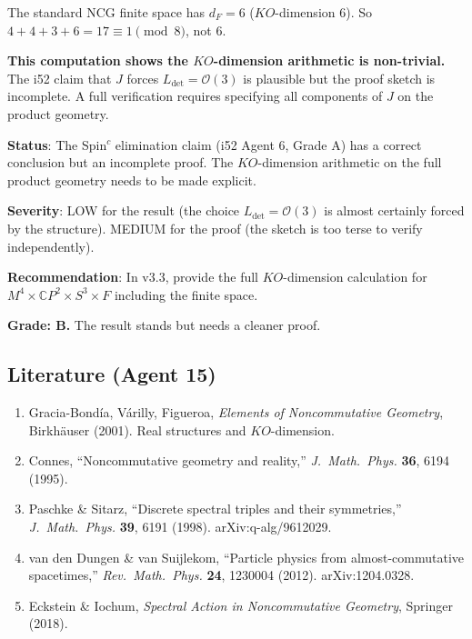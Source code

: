 \documentclass[11pt,a4paper]{article}
\newcommand{\CP}{\mathbb{C}P}
\begin{document}
The standard NCG finite space has $d_F = 6$ ($KO$-dimension 6). So $4 + 4 + 3 + 6 = 17 \equiv 1 \pmod{8}$, not 6.

\textbf{This computation shows the $KO$-dimension arithmetic is non-trivial.} The i52 claim that $J$ forces $L_{\det} = \mathcal{O}(3)$ is plausible but the proof sketch is incomplete. A full verification requires specifying all components of $J$ on the product geometry.

\begin{tcolorbox}[colback=yellow!5!white, colframe=yellow!60!black, title={Agent 15: Spin$^c$ Audit}]
\textbf{Status}: The Spin$^c$ elimination claim (i52 Agent 6, Grade A) has a correct conclusion but an incomplete proof. The $KO$-dimension arithmetic on the full product geometry needs to be made explicit.

\textbf{Severity}: LOW for the result (the choice $L_{\det} = \mathcal{O}(3)$ is almost certainly forced by the structure). MEDIUM for the proof (the sketch is too terse to verify independently).

\textbf{Recommendation}: In v3.3, provide the full $KO$-dimension calculation for $M^4 \times \CP^2 \times S^3 \times F$ including the finite space.

\textbf{Grade: B.} The result stands but needs a cleaner proof.
\end{tcolorbox}

\subsection{Literature (Agent 15)}

\begin{enumerate}
\item Gracia-Bond\'ia, V\'arilly, Figueroa, \textit{Elements of Noncommutative Geometry}, Birkh\"auser (2001). Real structures and $KO$-dimension.
\item Connes, ``Noncommutative geometry and reality,'' \textit{J.\ Math.\ Phys.} \textbf{36}, 6194 (1995).
\item Paschke \& Sitarz, ``Discrete spectral triples and their symmetries,'' \textit{J.\ Math.\ Phys.} \textbf{39}, 6191 (1998). arXiv:q-alg/9612029.
\item van den Dungen \& van Suijlekom, ``Particle physics from almost-commutative spacetimes,'' \textit{Rev.\ Math.\ Phys.} \textbf{24}, 1230004 (2012). arXiv:1204.0328.
\item Eckstein \& Iochum, \textit{Spectral Action in Noncommutative Geometry}, Springer (2018).
\end{enumerate}
\end{document}
